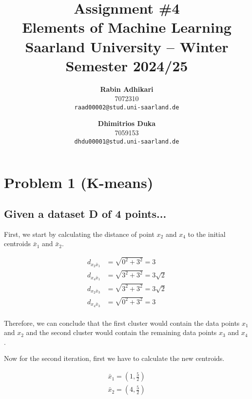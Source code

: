 \documentclass{article}
\title{Assignment \#4\\
  \vspace{2mm}
  \small{Elements of Machine Learning}
  \\
  \vspace{2mm}
  \small{Saarland University -- Winter Semester 2024/25}
}
\author{%
\textbf{Rabin Adhikari} \\
  7072310 \\
  \texttt{raad00002@stud.uni-saarland.de} \\
  \and
  \textbf{Dhimitrios Duka} \\
 7059153 \\
  \texttt{dhdu00001@stud.uni-saarland.de} \\
}
\begin{document}
\maketitle

\section{Problem 1 (K-means)}
\subsection{Given a dataset D of 4 points...}

First, we start by calculating the distance of point $x_2$ and $x_4$ to the initial centroids $\bar{x}_1$ and $\bar{x}_2$. 

\begin{equation}
  \begin{aligned}
    d_{x_2\bar{x}_1} &= \sqrt{0^2 + 3^2} = 3 \\
    d_{x_4\bar{x}_1} &= \sqrt{3^2 + 3^2} = 3\sqrt{2} \\
    d_{x_2\bar{x}_3} &= \sqrt{3^2 + 3^2} = 3\sqrt{2} \\
    d_{x_4\bar{x}_3} &= \sqrt{0^2 + 3^2} = 3 \\
  \end{aligned}
\end{equation}

Therefore, we can conclude that the first cluster would contain the data points $x_1$ and $x_2$ and the second cluster would contain the remaining data points $x_3$ and $x_4$.

Now for the second iteration, first we have to calculate the new centroids. 

\begin{equation}
  \begin{aligned}
    \bar{x}_1 = (1, \frac{5}{2}) \\
    \bar{x}_2 = (4, \frac{5}{2})
  \end{aligned}
\end{equation}
\end{document}
